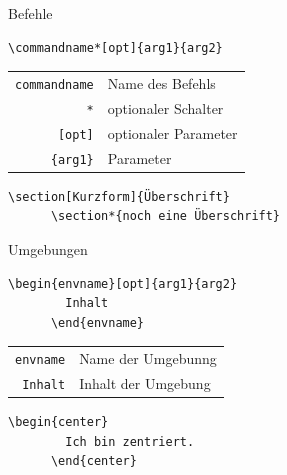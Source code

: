 \begin{Frame}[fragile]{Befehle}
  \begin{Definition}[Befehl]
    \begin{lstlisting}[gobble=6,style=block,morekeywords={commandname}]
      \commandname*[opt]{arg1}{arg2}
    \end{lstlisting}

    \begin{tabular}{rl}
      \lstinline[morekeywords={commandname}]-commandname- & Name des Befehls \\
      \lstinline-*- & optionaler Schalter \\
      \lstinline-[opt]- & optionaler Parameter \\
      \lstinline-{arg1}- & Parameter
    \end{tabular}
  \end{Definition}

  \xxx

  \begin{Beispiel}[Befehl]
    \begin{lstlisting}[gobble=6,style=block]
      \section[Kurzform]{Überschrift}
      \section*{noch eine Überschrift}
    \end{lstlisting}
  \end{Beispiel}
\end{Frame}

\begin{Frame}[fragile]{Umgebungen}
  \begin{Definition}[Umgebung]
    \begin{lstlisting}[gobble=6,style=block,morekeywords={[2]envname}]
      \begin{envname}[opt]{arg1}{arg2}
        Inhalt
      \end{envname}
    \end{lstlisting}

    \begin{tabular}{rl}
      \lstinline-envname- & Name der Umgebunng \\
      \lstinline-Inhalt- & Inhalt der Umgebung
    \end{tabular}
  \end{Definition}

  \xxx

  \begin{Beispiel}[Umgebung]
    \begin{lstlisting}[gobble=6,style=block]
      \begin{center}
        Ich bin zentriert.
      \end{center}
    \end{lstlisting}
  \end{Beispiel}
\end{Frame}

